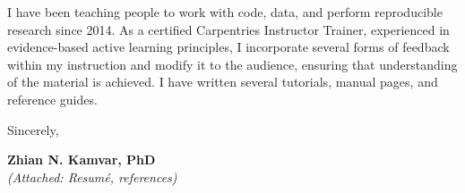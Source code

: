 \vspace{2ex}

I have been teaching people to work with code, data, and perform reproducible research since 2014. 
As a certified Carpentries Instructor Trainer, experienced in evidence-based active learning principles, I incorporate several forms of feedback within my instruction and modify it to the audience, ensuring that understanding of the material is achieved. 
I have written several tutorials, manual pages, and reference guides. 
\vspace{3ex}

Sincerely,

\vspace{4ex}

\textbf{Zhian N. Kamvar, PhD}\\
{\footnotesize \textit{(Attached: Resum\'{e}, references)}}

\clearpage



